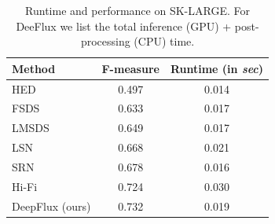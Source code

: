 \documentclass[10pt,twocolumn,letterpaper]{article}
\begin{document}

\begin{table}
\begin{center}
\begin{tabular}{|l|c|c|}
\hline
Method & F-measure & Runtime (in \emph{sec}) \\
\hline\hline
HED~\cite{xie2015hed} & 0.497 & 0.014 \\
\hline
FSDS~\cite{shen2016fsds} & 0.633 & 0.017 \\
\hline
LMSDS~\cite{shen2017lmsds} & 0.649 & 0.017 \\
\hline
LSN~\cite{liu2018lsn} & 0.668 & 0.021 \\
\hline
SRN~\cite{ke2017srn} & 0.678 & 0.016 \\
\hline
Hi-Fi~\cite{zhao2018hifi} & 0.724 & 0.030 \\
\hline
DeepFlux (ours) & 0.732 & 0.019 \\
\hline
\end{tabular}
\end{center}
\caption{Runtime and performance on SK-LARGE. For DeeFlux we list the total inference (GPU) + post-processing (CPU) time. }
\label{tab:runtime}
\end{table}
\end{document}
